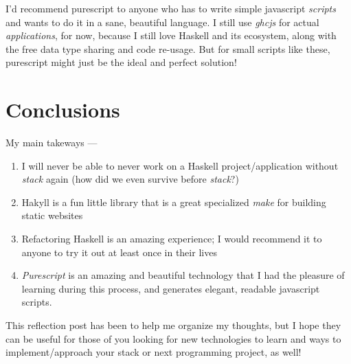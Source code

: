 \documentclass[]{article}
\begin{document}
I'd recommend purescript to anyone who has to write simple javascript
\emph{scripts} and wants to do it in a sane, beautiful language. I still
use \emph{ghcjs} for actual \emph{applications}, for now, because I
still love Haskell and its ecosystem, along with the free data type
sharing and code re-usage. But for small scripts like these, purescript
might just be the ideal and perfect solution!

\section{Conclusions}\label{conclusions}

My main takeways ---

\begin{enumerate}
\def\labelenumi{\arabic{enumi}.}
\tightlist
\item
  I will never be able to never work on a Haskell project/application
  without \emph{stack} again (how did we even survive before
  \emph{stack}?)
\item
  Hakyll is a fun little library that is a great specialized \emph{make}
  for building static websites
\item
  Refactoring Haskell is an amazing experience; I would recommend it to
  anyone to try it out at least once in their lives
\item
  \emph{Purescript} is an amazing and beautiful technology that I had
  the pleasure of learning during this process, and generates elegant,
  readable javascript scripts.
\end{enumerate}

This reflection post has been to help me organize my thoughts, but I
hope they can be useful for those of you looking for new technologies to
learn and ways to implement/approach your stack or next programming
project, as well!
\end{document}
